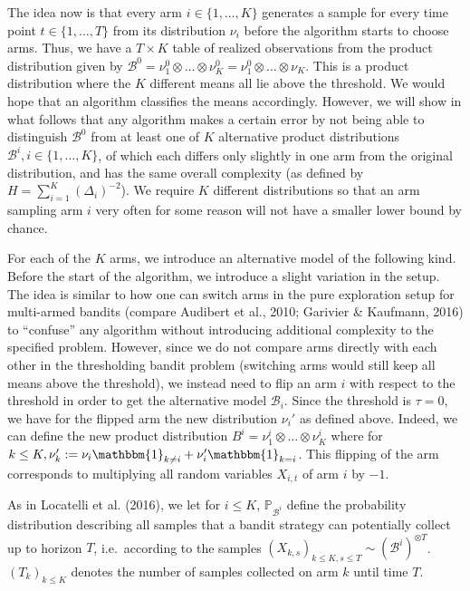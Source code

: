 \documentclass[12pt,]{article}
\begin{document}
The idea now is that every arm \(i \in \{1,\dots,K\}\) generates a
sample for every time point \(t\in \{1, \dots, T\}\) from its
distribution \(\nu_i\) before the algorithm starts to choose arms. Thus,
we have a \(T \times K\) table of realized observations from the product
distribution given by
\(\mathcal{B}^0 = \nu_1^0 \otimes \ldots \otimes \nu_K^0 = \nu_1^0 \otimes \ldots \otimes \nu_K\).
This is a product distribution where the \(K\) different means all lie
above the threshold. We would hope that an algorithm classifies the
means accordingly. However, we will show in what follows that any
algorithm makes a certain error by not being able to distinguish
\(\mathcal{B}^0\) from at least one of \(K\) alternative product
distributions \(\mathcal{B}^i, i \in \{1, \dots, K\}\), of which each
differs only slightly in one arm from the original distribution, and has
the same overall complexity (as defined by
\(H = \sum_{i=1}^K (\Delta_i)^{-2}\)). We require \(K\) different
distributions so that an arm sampling arm \(i\) very often for some
reason will not have a smaller lower bound by chance.

For each of the \(K\) arms, we introduce an alternative model of the
following kind. Before the start of the algorithm, we introduce a slight
variation in the setup. The idea is similar to how one can switch arms
in the pure exploration setup for multi-armed bandits (compare Audibert
et al., 2010; Garivier \& Kaufmann, 2016) to ``confuse'' any algorithm
without introducing additional complexity to the specified problem.
However, since we do not compare arms directly with each other in the
thresholding bandit problem (switching arms would still keep all means
above the threshold), we instead need to flip an arm \(i\) with respect
to the threshold in order to get the alternative model
\(\mathcal{B}_i\). Since the threshold is \(\tau = 0\), we have for the
flipped arm the new distribution \(\nu_i'\) as defined above. Indeed, we
can define the new product distribution
\(B^i = \nu_1^i \otimes \dots \otimes \nu_K^i\) where for
\(k \leq K, \nu_k' := \nu_i \mathbbm{1}_{k \neq i} + \nu_i' \mathbbm{1}_{k=i}\).
This flipping of the arm corresponds to multiplying all random variables
\(X_{i,t}\) of arm \(i\) by \(-1\).

As in Locatelli et al. (2016), we let for \(i \leq K\),
\(\mathbb{P}_{\mathcal{B}^i}\) define the probability distribution
describing all samples that a bandit strategy can potentially collect up
to horizon \(T\), i.e.~according to the samples
\((X_{k,s})_{k\leq K, s \leq T} \sim (\mathcal{B}^i)^{\otimes T}\).
\((T_k)_{k\leq K}\) denotes the number of samples collected on arm \(k\)
until time \(T\).
\end{document}
